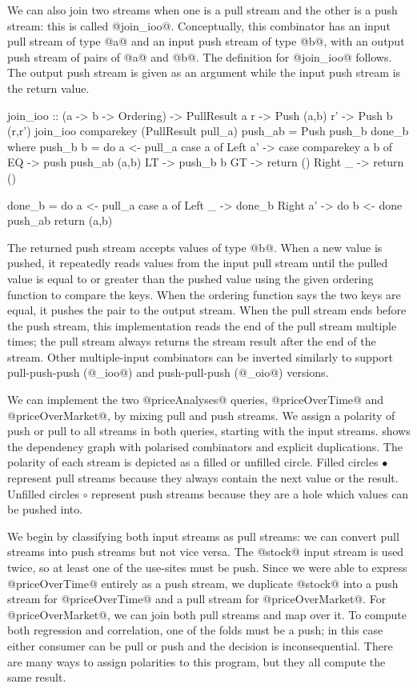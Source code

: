 We can also join two streams when one is a pull stream and the other is a push stream: this is called @join_ioo@.
Conceptually, this combinator has an input pull stream of type @a@ and an input push stream of type @b@, with an output push stream of pairs of @a@ and @b@.
The definition for @join_ioo@ follows.
The output push stream is given as an argument while the input push stream is the return value.

\begin{haskell}
join_ioo :: (a -> b -> Ordering)
         -> PullResult a r
         -> Push (a,b) r'
         -> Push b (r,r')
join_ioo comparekey (PullResult pull_a) push_ab = Push push_b done_b
 where
  push_b b = do
    a <- pull_a
    case a of
     Left a' -> case comparekey a b of
      EQ -> push push_ab (a,b)
      LT -> push_b b
      GT -> return ()
     Right _ -> return () 

  done_b = do
    a <- pull_a
    case a of
     Left _ -> done_b
     Right a' -> do
      b <- done push_ab
      return (a,b)
\end{haskell}

The returned push stream accepts values of type @b@.
When a new value is pushed, it repeatedly reads values from the input pull stream until the pulled value is equal to or greater than the pushed value using the given ordering function to compare the keys.
When the ordering function says the two keys are equal, it pushes the pair to the output stream.
When the pull stream ends before the push stream, this implementation reads the end of the pull stream multiple times; the pull stream always returns the stream result after the end of the stream.
Other multiple-input combinators can be inverted similarly to support pull-push-push (@_ioo@) and push-pull-push (@_oio@) versions.

We can implement the two @priceAnalyses@ queries, @priceOverTime@ and @priceOverMarket@, by mixing pull and push streams.
We assign a polarity of push or pull to all streams in both queries, starting with the input streams.
 shows the dependency graph with polarised combinators and explicit duplications.
The polarity of each stream is depicted as a filled or unfilled circle.
Filled circles $\bullet$ represent pull streams because they always contain the next value or the result.
Unfilled circles $\circ$ represent push streams because they are a hole which values can be pushed into.

We begin by classifying both input streams as pull streams: we can convert pull streams into push streams but not vice versa.
The @stock@ input stream is used twice, so at least one of the use-sites must be push.
Since we were able to express @priceOverTime@ entirely as a push stream, we duplicate @stock@ into a push stream for @priceOverTime@ and a pull stream for @priceOverMarket@.
For @priceOverMarket@, we can join both pull streams and map over it.
To compute both regression and correlation, one of the folds must be a push; in this case either consumer can be pull or push and the decision is inconsequential.
There are many ways to assign polarities to this program, but they all compute the same result.

